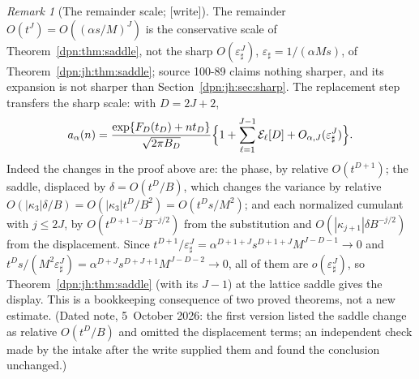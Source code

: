 \documentclass[11pt]{article}
\numberwithin{equation}{section}
\theoremstyle{definition}\newtheorem{definition}[theorem]{Definition}
\theoremstyle{remark}\newtheorem{remark}[theorem]{Remark}
\newcommand{\epsh}{\varepsilon_{\sharp}}
\newcommand{\wrt}{\textup{[write]}}
\begin{document}
\begin{remark}[The remainder scale; \wrt]\label{dpn:rb:rem:sharp}
The remainder $O(t^J)=O((\alpha s/M)^J)$ is the conservative scale of
Theorem~\ref{dpn:thm:saddle}, not the sharp $O(\epsh^J)$, $\epsh=1/(\alpha Ms)$,
of Theorem~\ref{dpn:jh:thm:saddle}; source 100-89 claims nothing sharper, and
its expansion is not sharper than Section~\ref{dpn:jh:sec:sharp}.  The
replacement step transfers the sharp scale: with $D=2J+2$,
\[
 a_\alpha(n)=\frac{\exp\{F_D(t_D)+nt_D\}}{\sqrt{2\pi B_D}}
 \Bigl\{1+\sum_{\ell=1}^{J-1}\mathcal E_\ell[D]+O_{\alpha,J}(\epsh^{J})\Bigr\}.
\]
Indeed the changes in the proof above are: the phase, by relative
$O(t^{D+1})$; the saddle, displaced by $\delta=O(t^{D}/B)$, which changes the
variance by relative $O(|\kappa_3|\delta/B)=O(|\kappa_3|t^D/B^2)=O(t^Ds/M^2)$;
and each normalized cumulant with $j\le2J$, by $O(t^{D+1-j}B^{-j/2})$ from the
substitution and $O(|\kappa_{j+1}|\delta B^{-j/2})$ from the displacement.
Since $t^{D+1}/\epsh^J=\alpha^{D+1+J}s^{D+1+J}M^{J-D-1}\to0$ and
$t^Ds/(M^2\epsh^J)=\alpha^{D+J}s^{D+J+1}M^{J-D-2}\to0$, all of them are
$o(\epsh^J)$, so Theorem~\ref{dpn:jh:thm:saddle} (with its $J-1$) at the
lattice saddle gives the display.  This is a bookkeeping consequence of two
proved theorems, not a new estimate.  (Dated note, 5~October 2026: the first
version listed the saddle change as relative $O(t^{D}/B)$ and omitted the
displacement terms; an independent check made by the intake after the write
supplied them and found the conclusion unchanged.)
\end{remark}
\end{document}
